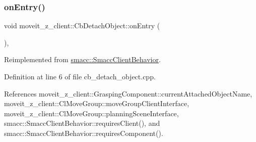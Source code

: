 \subsubsection{\texorpdfstring{on\+Entry()}{onEntry()}}
{\footnotesize\ttfamily void moveit\+\_\+z\+\_\+client\+::\+Cb\+Detach\+Object\+::on\+Entry (\begin{DoxyParamCaption}{ }\end{DoxyParamCaption})\hspace{0.3cm}{\ttfamily [override]}, {\ttfamily [virtual]}}



Reimplemented from \hyperlink{classsmacc_1_1SmaccClientBehavior_a7962382f93987c720ad432fef55b123f}{smacc\+::\+Smacc\+Client\+Behavior}.



Definition at line 6 of file cb\+\_\+detach\+\_\+object.\+cpp.



References moveit\+\_\+z\+\_\+client\+::\+Grasping\+Component\+::current\+Attached\+Object\+Name, moveit\+\_\+z\+\_\+client\+::\+Cl\+Move\+Group\+::move\+Group\+Client\+Interface, moveit\+\_\+z\+\_\+client\+::\+Cl\+Move\+Group\+::planning\+Scene\+Interface, smacc\+::\+Smacc\+Client\+Behavior\+::requires\+Client(), and smacc\+::\+Smacc\+Client\+Behavior\+::requires\+Component().


